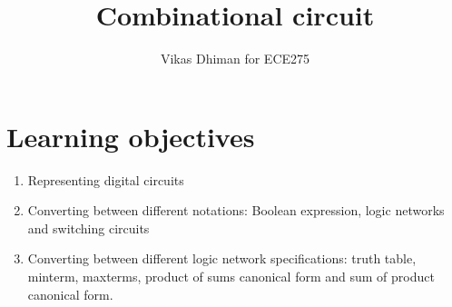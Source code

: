 \documentclass{article}
\title{Combinational circuit}
\author{Vikas Dhiman for ECE275}
\begin{document}
\maketitle
\section{Learning objectives}
\begin{enumerate}
\item Representing digital circuits
\item Converting between different notations: Boolean expression, logic
  networks and switching circuits
\item Converting between different logic network specifications: truth table, minterm,
  maxterms, product of sums canonical form and sum of product canonical form.
\end{enumerate}

\newpage
\end{document}
